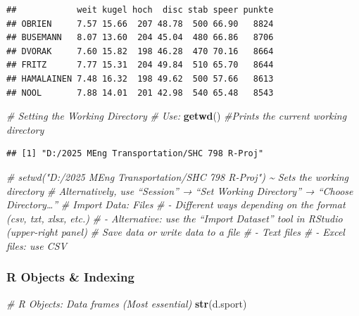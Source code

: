 \documentclass[
]{article}
\newenvironment{Shaded}{\begin{snugshade}}{\end{snugshade}}
\newcommand{\CommentTok}[1]{\textcolor[rgb]{0.56,0.35,0.01}{\textit{#1}}}
\newcommand{\FunctionTok}[1]{\textcolor[rgb]{0.13,0.29,0.53}{\textbf{#1}}}
\newcommand{\NormalTok}[1]{#1}
\begin{document}
\begin{verbatim}
##            weit kugel hoch  disc stab speer punkte
## OBRIEN     7.57 15.66  207 48.78  500 66.90   8824
## BUSEMANN   8.07 13.60  204 45.04  480 66.86   8706
## DVORAK     7.60 15.82  198 46.28  470 70.16   8664
## FRITZ      7.77 15.31  204 49.84  510 65.70   8644
## HAMALAINEN 7.48 16.32  198 49.62  500 57.66   8613
## NOOL       7.88 14.01  201 42.98  540 65.48   8543
\end{verbatim}

\begin{Shaded}
\begin{Highlighting}[]
\CommentTok{\# Setting the Working Directory}
\CommentTok{\# Use:}
\FunctionTok{getwd}\NormalTok{() }\CommentTok{\#Prints the current working directory}
\end{Highlighting}
\end{Shaded}

\begin{verbatim}
## [1] "D:/2025 MEng Transportation/SHC 798 R-Proj"
\end{verbatim}

\begin{Shaded}
\begin{Highlighting}[]
\CommentTok{\# setwd("D:/2025 MEng Transportation/SHC 798 R{-}Proj") \textasciitilde{} Sets the working directory}
\CommentTok{\# Alternatively, use “Session” → “Set Working Directory” → “Choose Directory…”}
\CommentTok{\# Import Data: Files}
  \CommentTok{\# {-} Different ways depending on the format (csv, txt, xlsx, etc.) }
  \CommentTok{\# {-} Alternative: use the “Import Dataset” tool in RStudio (upper{-}right panel)}
\CommentTok{\# Save data or write data to a file}
  \CommentTok{\# {-} Text files}
  \CommentTok{\# {-} Excel files: use CSV}
\end{Highlighting}
\end{Shaded}

\subsubsection{R Objects \& Indexing}\label{r-objects-indexing}

\begin{Shaded}
\begin{Highlighting}[]
\CommentTok{\# R Objects: Data frames (Most essential)}
\FunctionTok{str}\NormalTok{(d.sport)}
\end{Highlighting}
\end{Shaded}
\end{document}
